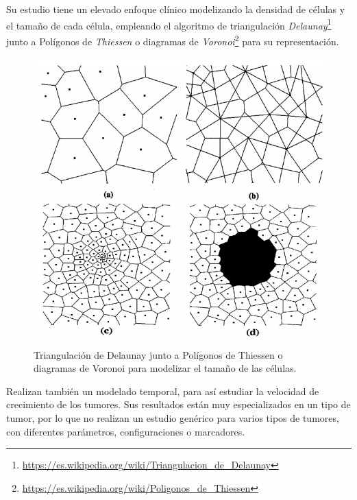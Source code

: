 Su estudio tiene un elevado enfoque clínico modelizando la densidad de células y
el tamaño de cada célula, empleando el algoritmo de triangulación \textit{Delaunay}\footnote{\url{https://es.wikipedia.org/wiki/Triangulacion_de_Delaunay}}
junto a Polígonos de \textit{Thiessen} o diagramas de \textit{Voronoi}\footnote{\url{https://es.wikipedia.org/wiki/Poligonos_de_Thiessen}} para su representación.

\begin{figure}[h]
\centering
\includegraphics[scale=0.7]{figures/modelado_tamanio}
\caption{Triangulación de Delaunay junto a Polígonos de Thiessen o diagramas de Voronoi para modelizar el tamaño de las células.}
\end{figure}

Realizan también un modelado temporal, para así estudiar la velocidad de crecimiento de los tumores.
Sus resultados están muy especializados en un tipo de tumor, por lo que no realizan un estudio genérico
para varios tipos de tumores, con diferentes parámetros, configuraciones o marcadores.
